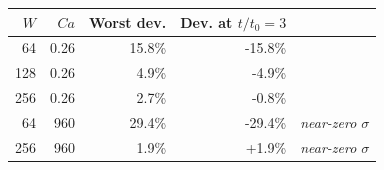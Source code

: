 \begin{tabular}{rrrrl}
\toprule
$W$ & $Ca$ & Worst dev. & Dev. at $t/t_0=3$ & \\
\midrule
64 & 0.26 & 15.8\% & -15.8\% &  \\
128 & 0.26 & 4.9\% & -4.9\% &  \\
256 & 0.26 & 2.7\% & -0.8\% &  \\
\midrule
64 & 960 & 29.4\% & -29.4\% & \textit{near-zero $\sigma$} \\
256 & 960 & 1.9\% & +1.9\% & \textit{near-zero $\sigma$} \\
\bottomrule
\end{tabular}
